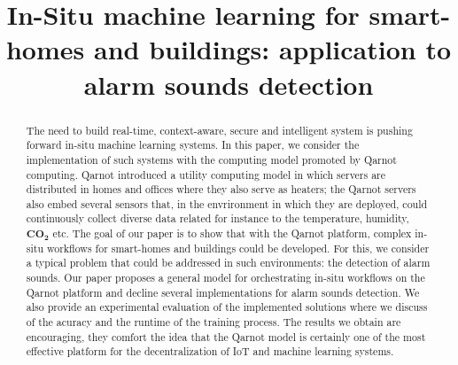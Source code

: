 \documentclass[10pt, conference, compsocconf]{IEEEtran}
\begin{document}
%
\title{In-Situ machine learning for smart-homes and buildings: application to alarm sounds detection}



\author{
\and
{}
\and
{}
}

\maketitle


\begin{abstract}
The need to build real-time, context-aware, secure and intelligent system is pushing forward in-situ machine learning systems. 
In this paper, we consider the implementation of such systems with the computing model promoted by 
Qarnot computing. Qarnot introduced a utility computing model in which servers are distributed in homes and offices where they also 
serve as heaters; the Qarnot servers also embed several sensors that, in the envrironment in which they are deployed, could continuously 
collect diverse data related for instance to the temperature, humidity, $\mathbf{CO_2}$ etc. The goal of our paper is to show that with the Qarnot 
platform, complex in-situ workflows for smart-homes and buildings could be developed. For this, we consider a typical problem that could be addressed in such environments: the detection of alarm sounds. Our paper proposes a general model for 
orchestrating in-situ workflows on 
the Qarnot platform and decline several implementations for alarm sounds detection. 
We also provide an experimental evaluation of the implemented solutions where we 
discuss of the acuracy and the runtime of the training process. The results we obtain are encouraging, they comfort the idea that the Qarnot
 model is certainly one of the most effective platform for the decentralization of IoT and machine learning systems. 
\end{abstract}
\end{document}
